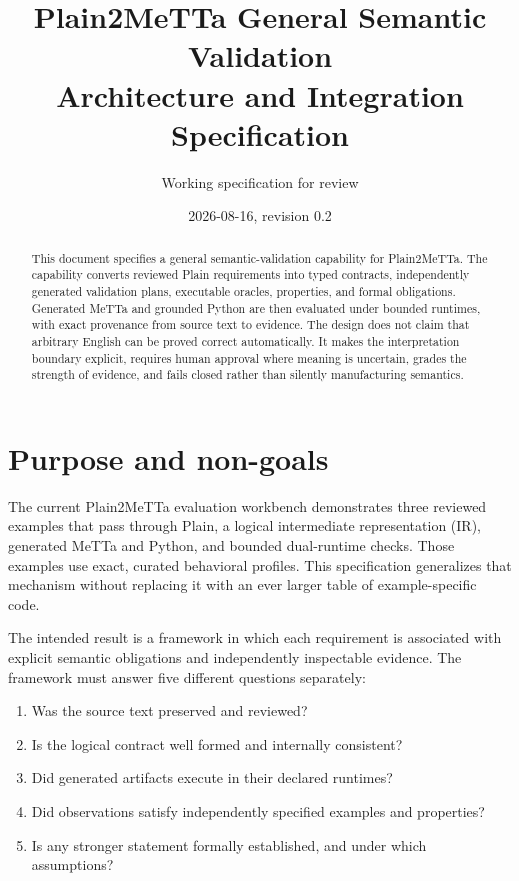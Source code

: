 \documentclass[10pt]{article}
\title{Plain2MeTTa General Semantic Validation\\
       Architecture and Integration Specification}
\author{Working specification for review}
\date{2026-08-16, revision 0.2}
\begin{document}
\maketitle

\begin{abstract}
This document specifies a general semantic-validation capability for
Plain2MeTTa.  The capability converts reviewed Plain requirements into typed
contracts, independently generated validation plans, executable oracles,
properties, and formal obligations.  Generated MeTTa and grounded Python are
then evaluated under bounded runtimes, with exact provenance from source text
to evidence.  The design does not claim that arbitrary English can be proved
correct automatically.  It makes the interpretation boundary explicit,
requires human approval where meaning is uncertain, grades the strength of
evidence, and fails closed rather than silently manufacturing semantics.
\end{abstract}

\tableofcontents

\section{Purpose and non-goals}

The current Plain2MeTTa evaluation workbench demonstrates three reviewed
examples that pass through Plain, a logical intermediate representation (IR),
generated MeTTa and Python, and bounded dual-runtime checks.  Those examples
use exact, curated behavioral profiles.  This specification generalizes that
mechanism without replacing it with an ever larger table of example-specific
code.

The intended result is a framework in which each requirement is associated
with explicit semantic obligations and independently inspectable evidence.
The framework must answer five different questions separately:

\begin{enumerate}
\item Was the source text preserved and reviewed?
\item Is the logical contract well formed and internally consistent?
\item Did generated artifacts execute in their declared runtimes?
\item Did observations satisfy independently specified examples and
      properties?
\item Is any stronger statement formally established, and under which
      assumptions?
\end{enumerate}
\end{document}
